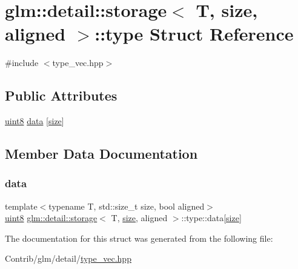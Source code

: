 \hypertarget{structglm_1_1detail_1_1storage_1_1type}{}\section{glm\+:\+:detail\+:\+:storage$<$ T, size, aligned $>$\+:\+:type Struct Reference}
\label{structglm_1_1detail_1_1storage_1_1type}


{\ttfamily \#include $<$type\+\_\+vec.\+hpp$>$}

\subsection*{Public Attributes}
\begin{DoxyCompactItemize}
\item 
\mbox{\hyperlink{namespaceglm_1_1detail_aef2588f97d090cc19fbbe0c74fe17c8f}{uint8}} \mbox{\hyperlink{structglm_1_1detail_1_1storage_1_1type_ab44756dae5eb9194e4e941c91ce9f257}{data}} \mbox{[}\mbox{\hyperlink{_s_d_l__opengl__glext_8h_a3d1e3edfcf61ca2d831883e1afbad89e}{size}}\mbox{]}
\end{DoxyCompactItemize}


\subsection{Member Data Documentation}
\mbox{\label{structglm_1_1detail_1_1storage_1_1type_ab44756dae5eb9194e4e941c91ce9f257}} 
\subsubsection{\texorpdfstring{data}{data}}
{\footnotesize\ttfamily template$<$typename T, std\+::size\+\_\+t size, bool aligned$>$ \\
\mbox{\hyperlink{namespaceglm_1_1detail_aef2588f97d090cc19fbbe0c74fe17c8f}{uint8}} \mbox{\hyperlink{structglm_1_1detail_1_1storage}{glm\+::detail\+::storage}}$<$ T, \mbox{\hyperlink{_s_d_l__opengl__glext_8h_a3d1e3edfcf61ca2d831883e1afbad89e}{size}}, aligned $>$\+::type\+::data\mbox{[}\mbox{\hyperlink{_s_d_l__opengl__glext_8h_a3d1e3edfcf61ca2d831883e1afbad89e}{size}}\mbox{]}}



The documentation for this struct was generated from the following file\+:\begin{DoxyCompactItemize}
\item 
Contrib/glm/detail/\mbox{\hyperlink{type__vec_8hpp}{type\+\_\+vec.\+hpp}}\end{DoxyCompactItemize}
